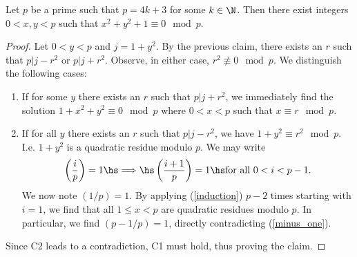 \documentclass{article}
\begin{document}
\begin{claim*}[2]
   Let $p$ be a prime such that $p=4k+3$ for some $k\in\N$. Then there exist 
   integers $0<x,y<p$ such that $x^2+y^2+1\equiv 0\mod p$.
   \begin{proof}
      Let $0<y<p$ and $j=1+y^2$. By the previous claim, there exists an $r$ such that 
      $p|j-r^2$ or $p|j+r^2$. Observe, in either case, $r^2\not\equiv 0\mod p$. We distinguish the following cases:
      \begin{enumerate}[label=C\arabic*.]
         \item If for some $y$ there exists an $r$ such that $p|j+r^2$, we immediately find the 
            solution $1+x^2+y^2\equiv 0\mod p$ where $0<x<p$ such that $x\equiv r\mod p$.
         \item If for all $y$ there exists an $r$ such that $p|j-r^2$, we have $1+y^2\equiv r^2\mod p$.
            I.e. $1+y^2$ is a quadratic residue modulo $p$. We may write 
            \begin{align}
               \label{induction}
               \left(\frac{i}{p}\right)=1\hs\Longrightarrow\hs \left(\frac{i+1}{p}\right)=1 \hs \text{for all }0<i<p-1.
            \end{align}
            We now note $(1/p)=1$.  By applying (\ref{induction}) $p-2$ times starting with $i=1$, we find that 
            all $1\leq x<p$ are quadratic residues modulo $p$. In particular, we find $(p-1/p)=1$, directly contradicting (\ref{minus_one}).
      \end{enumerate}
      Since C2 leads to a contradiction, C1 must hold, thus proving the claim.
   \end{proof}
\end{claim*}
\end{document}
